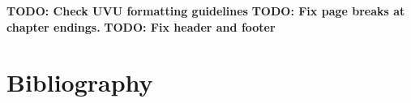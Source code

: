 \documentclass[letterpaper, 11pt, openany, notitlepage]{report}
\begin{document}

\textbf{TODO: Check UVU formatting guidelines}
\textbf{TODO: Fix page breaks at chapter endings.}
\textbf{TODO: Fix header and footer}


\tableofcontents
\listoftables
\listoffigures

\newpage

\pagestyle{fancy}
\begin{multicols}{2}
	








%



\end{multicols}
\newpage
\appendix


\chapter{Bibliography}
\printbibliography[heading=none]



%
\end{document}
